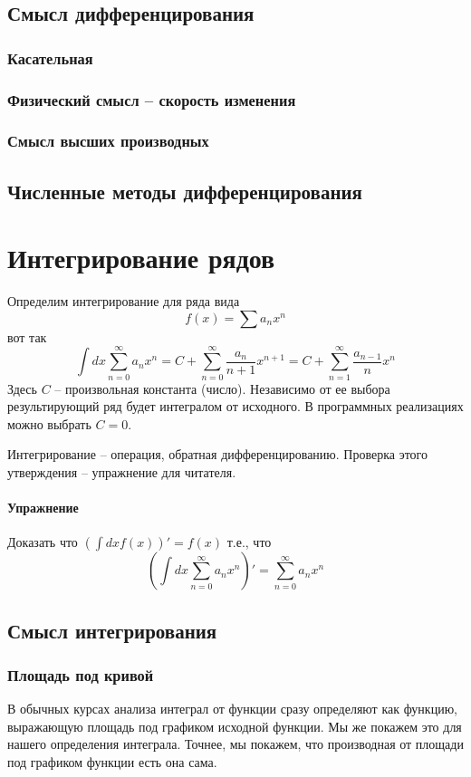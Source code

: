 \documentclass{article}
\newenvironment{excercise}{\paragraph{Упражнение }}{}
\begin{document}
\subsection{Смысл дифференцирования}
\subsubsection{Касательная}
\subsubsection{Физический смысл -- скорость изменения}
\subsubsection{Смысл высших производных}
\subsection{Численные методы дифференцирования}
\section{Интегрирование рядов}

Определим интегрирование для ряда вида $$f(x) = \sum a_n x^n$$ вот так
\begin{equation}
\label{eq-integral}
\int dx \sum_{n=0}^{\infty} a_n x^n = C+\sum_{n=0}^{\infty} \frac{a_n}{n+1} x^{n+1} = C+\sum_{n=1}^{\infty}\frac{a_{n-1}}{n}x^n
\end{equation}
Здесь $C$ -- произвольная константа (число). Независимо от ее выбора результирующий ряд будет интегралом от исходного. В программных реализациях можно выбрать $C=0$.

Интегрирование -- операция, обратная дифференцированию. Проверка этого утверждения -- упражнение для читателя.
\begin{excercise}
Доказать что $(\int dx f(x))' = f(x)$ т.е., что
\begin{equation}
\label{eq-int-inverse}
(\int dx  \sum_{n=0}^{\infty} a_n x^n )' =  \sum_{n=0}^{\infty} a_n x^n
\end{equation}
\end{excercise}
\subsection{Смысл интегрирования}
\subsubsection{Площадь под кривой}
В обычных курсах анализа интеграл от функции сразу определяют как
функцию, выражающую площадь под графиком исходной функции. Мы же
покажем это для нашего определения интеграла. Точнее, мы покажем, что
производная от площади под графиком функции есть она сама. 
\end{document}
